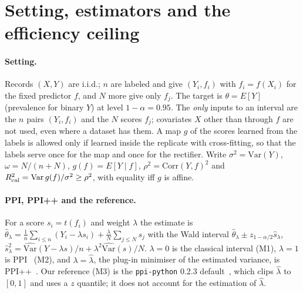 \section{Setting, estimators and the efficiency ceiling}
\label{sec:setting}
\paragraph{Setting.} Records $(X,Y)$ are i.i.d.; $n$ are labeled and give $(Y_i,f_i)$ with $f_i=f(X_i)$ for the fixed predictor $f$, and $N$ more give only $f_j$. The target is $\theta=E[Y]$ (prevalence for binary $Y$) at level $1-\alpha=0.95$. The \emph{only} inputs to an interval are the $n$ pairs $(Y_i,f_i)$ and the $N$ scores $f_j$; covariates $X$ other than through $f$ are not used, even where a dataset has them. A map $g$ of the scores learned from the labels is allowed only if learned inside the replicate with cross-fitting, so that the labels serve once for the map and once for the rectifier. Write $\sigma^2=\mathrm{Var}(Y)$, $\omega=N/(n+N)$, $g(f)=E[Y\mid f]$, $\rho^2=\mathrm{Corr}(Y,f)^2$ and $R^2_{\rm cal}=\mathrm{Var}\,g(f)/\sigma^2\ge\rho^2$, with equality iff $g$ is affine.

\paragraph{PPI, PPI++ and the reference.} For a score $s_i=t(f_i)$ and weight $\lambda$ the estimate is $\hat\theta_\lambda=\frac1n\sum_{i\le n}(Y_i-\lambda s_i)+\frac{\lambda}{N}\sum_{j\le N}s_j$ with the Wald interval $\hat\theta_\lambda\pm z_{1-\alpha/2}\hat s_\lambda$, $\hat s^2_\lambda=\widehat{\mathrm{Var}}(Y-\lambda s)/n+\lambda^2\widehat{\mathrm{Var}}(s)/N$. $\lambda=0$ is the classical interval (M1), $\lambda=1$ is PPI~\citep{angelopoulos2023ppi} (M2), and $\lambda=\hat\lambda$, the plug-in minimiser of the estimated variance, is PPI++~\citep{angelopoulos2023ppipp}. Our reference (M3) is the \texttt{ppi-python} 0.2.3 default~\citep{ppipython}, which clips $\hat\lambda$ to $[0,1]$ and uses a $z$ quantile; it does not account for the estimation of $\hat\lambda$.

